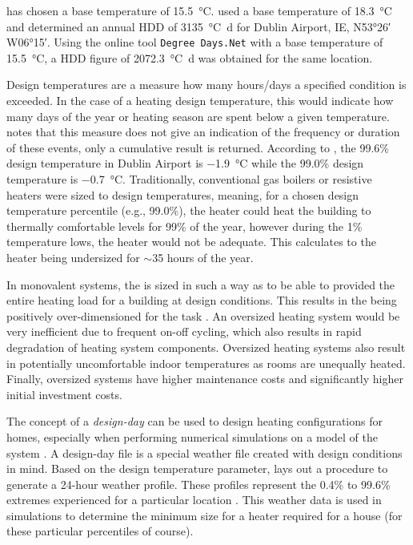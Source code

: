  has chosen a base temperature of \SI{15.5}{\celsius}.  used a base temperature of \SI{18.3}{\celsius} and determined an annual \ac{HDD} of \SI{3135}{\celsius\day} for Dublin Airport, IE, N\ang{53;26;} W\ang{06;15;}. Using the online tool \texttt{Degree Days.Net} \cite{degreedays} with a base temperature of \SI{15.5}{\celsius}, a \ac{HDD} figure of \SI{2072.3}{\celsius\day} was obtained for the same location.  

Design temperatures are a measure how many hours/days a specified condition is exceeded. In the case of a heating design temperature, this would indicate how many days of the year or heating season are spent below a given temperature.  notes that this measure does not give an indication of the frequency or duration of these events, only a cumulative result is returned. According to , the 99.6\% design temperature in Dublin Airport is \SI{-1.9}{\celsius} while the 99.0\% design temperature is \SI{-0.7}{\celsius}. Traditionally, conventional gas boilers or resistive heaters were sized to design temperatures, meaning, for a chosen design temperature percentile (e.g., 99.0\%), the heater could heat the building to thermally comfortable levels for 99\% of the year, however during the 1\% temperature lows, the heater would not be adequate. This calculates to the heater being undersized for $\sim$35 hours of the year. 

In monovalent systems, the \HP is sized in such a way as to be able to provided the entire heating load for a building at design conditions. This results in the \HP being positively over-dimensioned for the task \cite{klein_numerical_2014}. An oversized heating system would be very inefficient due to frequent on-off cycling, which also results in rapid degradation of heating system components. Oversized heating systems also result in potentially uncomfortable indoor temperatures as rooms are unequally heated. Finally, oversized systems have higher maintenance costs and significantly higher initial investment costs.

The concept of a \textit{design-day} can be used to design heating configurations for homes, especially when performing numerical simulations on a model of the system \cite{rauschkolb_cost-optimal_2020}.  A design-day file is a special weather file created with design conditions in mind. Based on the design temperature parameter,  lays out a procedure to generate a 24-hour weather profile. These profiles represent the 0.4\% to 99.6\% extremes experienced for a particular location \cite{owen_ashrae_2009}. This weather data is used in simulations to determine the minimum size for a heater required for a house (for these particular percentiles of course). 

